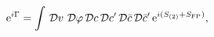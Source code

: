 \begin{equation}\label{4}
{\rm e}^{i\Gamma} = \int \,{\cal D}v\,\,{\cal D}\varphi\, {\cal
D}c\,{\cal D}c'\, {\cal D}\bar{c}\,{\cal D}\bar{c}'\, {\rm
e}^{i(S_{(2)}+S_{\rm FP})},
\end{equation}

